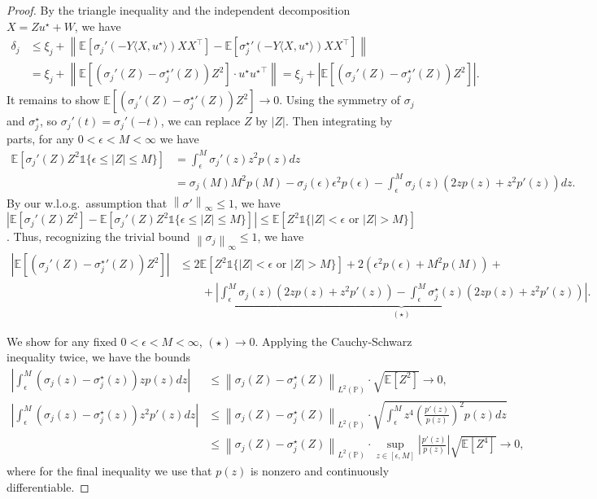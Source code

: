 \documentclass[11pt]{article}
\newcommand{\ind}{\mathds{1}}
\newcommand{\Ep}{\mathbb{E}}
\newcommand{\E}{\mathbb{E}}
\newcommand{\Prb}{\mathbb{P}}
\newcommand{\prn}[1]{\left({#1}\right)} %
\newcommand{\brk}[1]{\left[{#1}\right]} %
\newcommand{\norm}[1]{\left\|{#1}\right\|} %
\newcommand{\linf}[1]{\norm{#1}_\infty} %
\newcommand{\<}{\langle} %
\renewcommand{\>}{\rangle}
\newcommand{\LtwoP}[1]{\norm{#1}_{L^2(\Prb)}}
\newcommand{\opt}{^\star}
\begin{document}
\begin{proof}
  By the triangle inequality and the independent decomposition $X = Z u\opt
  + W$, we have
  \begin{align*}
    \delta_j & \leq \xi_j + \norm{\E\left[\sigma_j'(-Y\<X, u\opt\>) XX^\top\right] - \E\left[{\sigma_j\opt}'(-Y\<X, u\opt\>) XX^\top\right] } \nonumber \\
    & = \xi_j + \norm{\E\left[(\sigma_j'(Z)-{\sigma_j\opt}'(Z)) Z^2\right] \cdot u\opt {u\opt}^\top } = \xi_j + \left|\E\left[(\sigma_j'(Z)-{\sigma_j\opt}'(Z)) Z^2\right] \right|.
  \end{align*}
  It remains to show $\E\left[(\sigma_j'(Z)-{\sigma_j\opt}'(Z)) Z^2\right]
  \to 0$. Using the symmetry of $\sigma_j$ and $\sigma\opt_j$, so
  $\sigma_j'(t) = \sigma_j'(-t)$, we can replace $Z$ by $|Z|$. Then
  integrating by parts, for any $0 < \epsilon < M < \infty$ we have
  \begin{align*}
    \Ep \brk{\sigma_j'(Z) Z^2 \ind \{\epsilon \leq |Z| \leq M\}} & = \int_\epsilon^M \sigma_j'(z) z^2 p(z) dz \nonumber \\
    &= \sigma_j(M) M^2p(M) - \sigma_j(\epsilon) \epsilon^2 p(\epsilon)  - \int_\epsilon^M \sigma_j(z) (2z p(z) + z^2 p'(z)) dz.
  \end{align*}
  By our w.l.o.g.\ assumption that $\linf{\sigma'} \leq 1$, we have $|\Ep
  [\sigma_j'(Z) Z^2] - \Ep [\sigma_j'(Z) Z^2 \ind \{\epsilon \leq |Z| \leq
    M\}]| \leq \Ep[Z^2 \ind\{|Z| < \epsilon \text{ or } |Z| >
    M\}]$. Thus, recognizing the trivial
  bound $\linf{\sigma_j} \leq 1$, we have
  \begin{align*}
    \left|\E\left[(\sigma_j'(Z)-{\sigma_j\opt}'(Z)) Z^2\right] \right| &\leq 2 \Ep[Z^2 \ind\{|Z| < \epsilon \text{ or } |Z| > M\}] + 2 \prn{\epsilon^2 p(\epsilon) + M^2p(M)} + \nonumber \\
    & \qquad + \underbrace{\left|\int_\epsilon^M \sigma_j(z) (2z p(z) + z^2 p'(z)) -  \int_\epsilon^M \sigma_j\opt(z) (2z p(z) + z^2 p'(z))\right|}_{(\star)}.
  \end{align*}
 	
  We show for any fixed $0 < \epsilon < M < \infty$, $(\star) \to 0$. Applying
  the Cauchy-Schwarz inequality twice, we have the bounds
  \begin{align*}
    \left|\int_\epsilon^M (\sigma_j(z) - \sigma_j\opt(z)) z p(z) dz \right| &\leq \LtwoP{\sigma_j(Z) - \sigma_j\opt(Z)} \cdot \sqrt{\Ep[Z^2]} \to 0, \\
    \left|\int_\epsilon^M (\sigma_j(z) - \sigma_j\opt(z)) z^2 p'(z) dz \right| & \leq  \LtwoP{\sigma_j(Z) - \sigma_j\opt(Z)} \cdot \sqrt{\int_\epsilon^M z^4 \prn{\frac{p'(z)}{p(z)}}^2 p(z) dz} \nonumber \\
    & \leq \LtwoP{\sigma_j(Z) - \sigma_j\opt(Z)} \cdot \sup_{z \in [\epsilon, M]} \left|\frac{p'(z)}{p(z)}\right| \sqrt{\Ep[Z^4]} \to 0,
  \end{align*}
  where for the final inequality we use that $p(z)$ is nonzero and
  continuously differentiable.


\end{proof}
\end{document}
